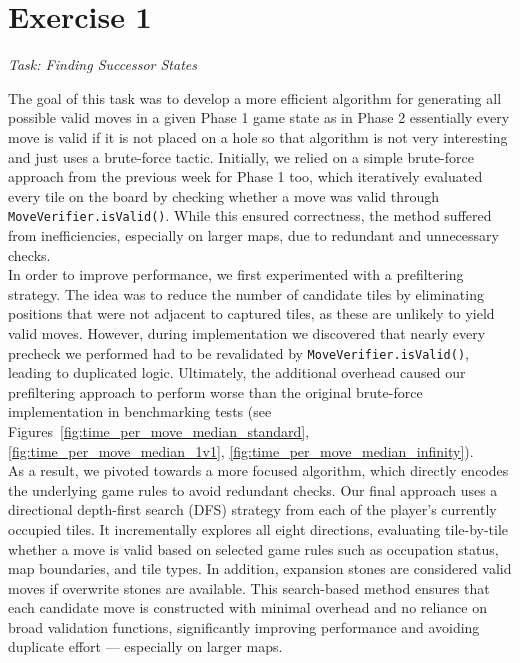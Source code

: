 \section*{Exercise 1}
\textit{Task: Finding Successor States}

\noindent The goal of this task was to develop a more efficient algorithm for generating all possible valid moves in a given Phase 1 game state as in Phase 2 essentially every move is valid if it is not placed on a hole so that algorithm is not very interesting and just uses a brute-force tactic. Initially, we relied on a simple brute-force approach from the previous week for Phase 1 too, which iteratively evaluated every tile on the board by checking whether a move was valid through \texttt{MoveVerifier.isValid()}. While this ensured correctness, the method suffered from inefficiencies, especially on larger maps, due to redundant and unnecessary checks.\\

\noindent In order to improve performance, we first experimented with a prefiltering strategy. The idea was to reduce the number of candidate tiles by eliminating positions that were not adjacent to captured tiles, as these are unlikely to yield valid moves. However, during implementation we discovered that nearly every precheck we performed had to be revalidated by \texttt{MoveVerifier.isValid()}, leading to duplicated logic. Ultimately, the additional overhead caused our prefiltering approach to perform worse than the original brute-force implementation in benchmarking tests (see Figures~\ref{fig:time_per_move_median_standard}, \ref{fig:time_per_move_median_1v1}, \ref{fig:time_per_move_median_infinity}).\\

\noindent As a result, we pivoted towards a more focused algorithm, which directly encodes the underlying game rules to avoid redundant checks. Our final approach uses a directional depth-first search (DFS) strategy from each of the player’s currently occupied tiles. It incrementally explores all eight directions, evaluating tile-by-tile whether a move is valid based on selected game rules such as occupation status, map boundaries, and tile types. In addition, expansion stones are considered valid moves if overwrite stones are available. This search-based method ensures that each candidate move is constructed with minimal overhead and no reliance on broad validation functions, significantly improving performance and avoiding duplicate effort — especially on larger maps.\\

